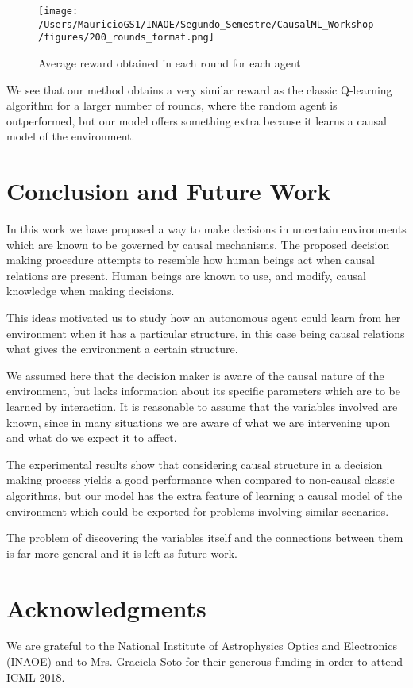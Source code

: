 \documentclass{article}
\begin{document}
\begin{figure}[ht]
\vskip 0.2in
\begin{center}
\centerline{\texttt{[image: /Users/MauricioGS1/INAOE/Segundo\_Semestre/CausalML\_Workshop/figures/200\_rounds\_format.png]}}
\caption{Average reward obtained in each round for each agent}
\label{200_rounds}
\end{center}
\vskip -0.2in
\end{figure}

We see that our method obtains a very similar reward as the classic Q-learning algorithm for a larger number of rounds, where the random agent is outperformed, but our model offers something extra because it learns a causal model of the environment. 

\section{Conclusion and Future Work}
In this work we have proposed a way to make decisions in uncertain environments which are known to be governed by causal mechanisms. The proposed decision making procedure attempts to resemble how human beings act when causal relations are present. Human beings are known to use, and modify, causal knowledge when making decisions. 

This ideas motivated us to study how an autonomous agent could learn from her environment when it has a particular structure, in this case being causal relations what gives the environment a certain structure. 

We assumed here that the decision maker is aware of the causal nature of the environment, but lacks information about its specific parameters which are to be learned by interaction. It is reasonable to assume that the variables involved are known, since in many situations we are aware of what we are intervening upon and what do we expect it to affect. 

The experimental results show that considering causal structure in a decision making process yields a good performance when compared to non-causal classic algorithms, but our model has the extra feature of learning a causal model of the environment which could be exported for problems involving similar scenarios.

The problem of discovering the variables itself and the connections between them is far more general and it is left as future work.

\section{Acknowledgments}
We are grateful to the National Institute of Astrophysics Optics and Electronics (INAOE) and to Mrs. Graciela Soto for their generous funding in order to attend ICML 2018. 



\end{document}
